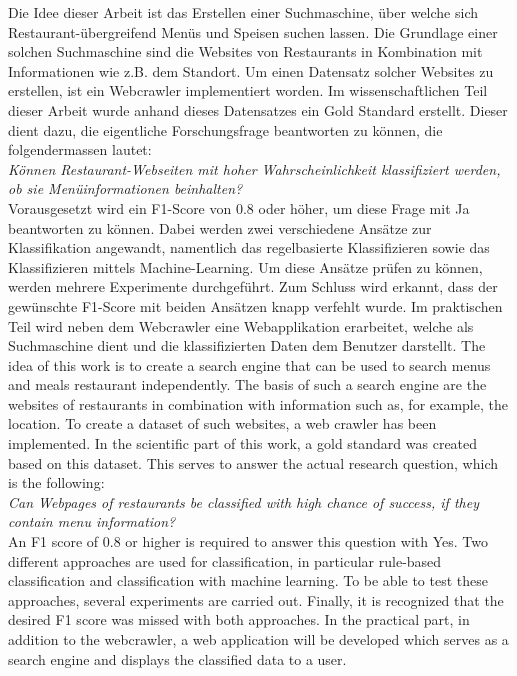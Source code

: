 Die Idee dieser Arbeit ist das Erstellen einer Suchmaschine, über welche sich Restaurant-übergreifend Menüs und Speisen suchen lassen.
Die Grundlage einer solchen Suchmaschine sind die Websites von Restaurants in Kombination mit Informationen wie z.B. dem Standort.
Um einen Datensatz solcher Websites zu erstellen, ist ein Webcrawler implementiert worden.
Im wissenschaftlichen Teil dieser Arbeit wurde anhand dieses Datensatzes ein Gold Standard erstellt.
Dieser dient dazu, die eigentliche Forschungsfrage beantworten zu können, die folgendermassen lautet:\\
\emph{Können Restaurant-Webseiten mit hoher Wahrscheinlichkeit klassifiziert werden, ob sie Menüinformationen beinhalten?}\\
Vorausgesetzt wird ein F1-Score von 0.8 oder höher, um diese Frage mit \glqq Ja\grqq{} beantworten zu können.
Dabei werden zwei verschiedene Ansätze zur Klassifikation angewandt, namentlich das regelbasierte Klassifizieren sowie das Klassifizieren mittels Machine-Learning.
Um diese Ansätze prüfen zu können, werden mehrere Experimente durchgeführt.
Zum Schluss wird erkannt, dass der gewünschte F1-Score mit beiden Ansätzen knapp verfehlt wurde.
Im praktischen Teil wird neben dem Webcrawler eine Webapplikation erarbeitet, welche als Suchmaschine dient und die klassifizierten Daten dem Benutzer darstellt.
The idea of this work is to create a search engine that can be used to search menus and meals restaurant independently.
The basis of such a search engine are the websites of restaurants in combination with information such as, for example, the location.
To create a dataset of such websites, a web crawler has been implemented.
In the scientific part of this work, a gold standard was created based on this dataset.
This serves to answer the actual research question, which is the following: \\
\emph{Can Webpages of restaurants be classified with high chance of success, if they contain menu information?} \\
An F1 score of 0.8 or higher is required to answer this question with \glqq Yes\grqq{}.
Two different approaches are used for classification, in particular rule-based classification and classification with machine learning.
To be able to test these approaches, several experiments are carried out.
Finally, it is recognized that the desired F1 score was missed with both approaches.
In the practical part, in addition to the webcrawler, a web application will be developed which serves as a search engine and displays the classified data to a user.